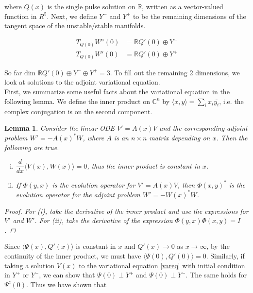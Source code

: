 \documentclass[12pt]{article}
\def\R{{\mathbb R}}
\def\C{{\mathbb C}}
\newtheorem{lemma}{Lemma}
\begin{document}
where $Q(x)$ is the single pulse solution on $\R$, written as a vector-valued function in $R^5$. Next, we define $Y^-$ and $Y^+$ to be the remaining dimensions of the tangent space of the unstable/stable manifolds.

\begin{align*}
T_{Q(0)} W^u(0) &= \R Q'(0) \oplus Y^- \\
T_{Q(0)} W^s(0) &= \R Q'(0) \oplus Y^+
\end{align*}

So far $\text{dim }\R Q'(0) \oplus Y^- \oplus Y^+ = 3$. To fill out the remaining 2 dimensions, we look at solutions to the adjoint variational equation.\\

First, we summarize some useful facts about the variational equation in the following lemma. We define the inner product on $\C^n$ by $\langle x, y \rangle = \sum_i x_i \bar{y_i}$, i.e. the complex conjugation is on the second component.


\begin{lemma}\label{eigadjoint}
Consider the linear ODE $V' = A(x)V$ and the corresponding adjoint problem $W' = -A(x)^* W$, where $A$ is an $n \times n$ matrix depending on $x$. Then the following are true.
\begin{enumerate}[(i)]
\item $\dfrac{d}{dx}\langle V(x), W(x) \rangle = 0$, thus the inner product is constant in $x$.
\item If $\Phi(y, x)$ is the evolution operator for $V' = A(x)V$, then $\Phi(x, y)^*$ is the evolution operator for the adjoint problem $W' = -W(x)^* W$.
\end{enumerate}
\begin{proof}
For (i), take the derivative of the inner product and use the expressions for $V'$ and $W'$. For (ii), take the derivative of the expression $\Phi(y, x)\Phi(x, y) = I$.
\end{proof}
\end{lemma}

Since $\langle \Psi(x), Q'(x) \rangle$ is constant in $x$ and $Q'(x) \rightarrow 0$ as $x \rightarrow \infty$, by the continuity of the inner product, we must have $\langle \Psi(0), Q'(0) \rangle = 0$. Similarly, if taking a solution $V(x)$ to the variational equation \eqref{vareq} with initial condition in $Y^+$ or $Y^-$, we can show that $\Psi(0) \perp Y^+$ and $\Psi(0) \perp Y^-$. The same holds for $\Psi^c(0)$. Thus we have shown that
\end{document}
